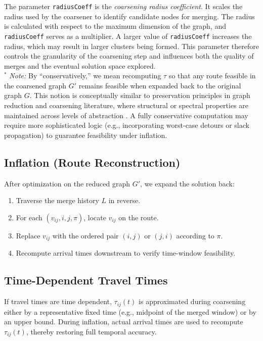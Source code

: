 \documentclass[conference]{IEEEtran}
\begin{document}
\begin{tablenotes}
\footnotesize
The parameter \texttt{radiusCoeff} is the \emph{coarsening radius coefficient}. It scales the radius used by the coarsener to identify candidate nodes for merging. The radius is calculated with respect to the maximum dimension of the graph, and \texttt{radiusCoeff} serves as a multiplier. A larger value of \texttt{radiusCoeff} increases the radius, which may result in larger clusters being formed. This parameter therefore controls the granularity of the coarsening step and influences both the quality of merges and the eventual solution space explored.\\

\noindent $^{*}$ \textit{Note:} By “conservatively,” we mean recomputing $\tau$ so that any route feasible in the coarsened graph $G'$ 
remains feasible when expanded back to the original graph $G$. This notion is conceptually similar to 
preservation principles in graph reduction and coarsening literature, where structural or spectral properties 
are maintained across levels of abstraction \cite{jin2018spectral,hashemi2024survey}. 
A fully conservative computation may require more sophisticated logic (e.g., incorporating worst-case detours or slack propagation) 
to guarantee feasibility under inflation.

\end{tablenotes}







\subsection{Inflation (Route Reconstruction)}
After optimization on the reduced graph $G'$, we expand the solution back:
\begin{enumerate}
  \item Traverse the merge history $L$ in reverse.
  \item For each $(v_{ij},i,j,\pi)$, locate $v_{ij}$ on the route.
  \item Replace $v_{ij}$ with the ordered pair $(i,j)$ or $(j,i)$ according to $\pi$.
  \item Recompute arrival times downstream to verify time-window feasibility.
\end{enumerate}

\subsection{Time-Dependent Travel Times}
If travel times are time dependent, $\tau_{ij}(t)$ is approximated during coarsening either by a representative fixed time (e.g., midpoint of the merged window) or by an upper bound. During inflation, actual arrival times are used to recompute $\tau_{ij}(t)$, thereby restoring full temporal accuracy.
\end{document}
